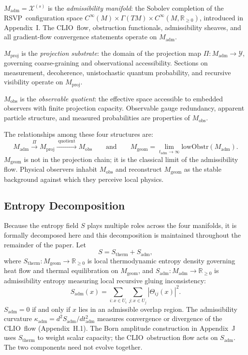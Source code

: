\documentclass[12pt,a4paper]{article}
\newcommand{\RSVP}{\textrm{RSVP}}
\newcommand{\CLIO}{\textrm{CLIO}}
\newcommand{\Field}{\mathcal{X}}
\begin{document}
$M_\mathrm{adm} = \Field^{(s)}$ is the \emph{admissibility manifold}: the
Sobolev completion of the \RSVP\ configuration space
$C^\infty(M)\times\Gamma(TM)\times C^\infty(M,\mathbb{R}_{\geq 0})$, introduced
in Appendix~I. The \CLIO\ flow, obstruction functionals, admissibility sheaves,
and all gradient-flow convergence statements operate on $M_\mathrm{adm}$.

$M_\mathrm{proj}$ is the \emph{projection substrate}: the domain of the
projection map $\Pi:M_\mathrm{adm}\to\mathcal{Y}$, governing coarse-graining
and observational accessibility. Sections on measurement, decoherence,
unistochastic quantum probability, and recursive visibility operate on
$M_\mathrm{proj}$.

$M_\mathrm{obs}$ is the \emph{observable quotient}: the effective space
accessible to embedded observers with finite projection capacity. Observable
gauge redundancy, apparent particle structure, and measured probabilities are
properties of $M_\mathrm{obs}$.

The relationships among these four structures are:
\[
M_\mathrm{adm}
\xrightarrow{\;\Pi\;}
M_\mathrm{proj}
\xrightarrow{\;\mathrm{quotient}\;}
M_\mathrm{obs}
\qquad\text{and}\qquad
M_\mathrm{geom}
= \lim_{t_\mathrm{adm}\to\infty}
  \mathrm{lowObstr}(M_\mathrm{adm}).
\]
$M_\mathrm{geom}$ is not in the projection chain; it is the classical limit of
the admissibility flow. Physical observers inhabit $M_\mathrm{obs}$ and
reconstruct $M_\mathrm{geom}$ as the stable background against which they
perceive local physics.

\subsection{Entropy Decomposition}

Because the entropy field $S$ plays multiple roles across the four manifolds,
it is formally decomposed here and this decomposition is maintained throughout
the remainder of the paper. Let
\[
S = S_\mathrm{therm} + S_\mathrm{adm},
\]
where $S_\mathrm{therm}: M_\mathrm{geom}\to\mathbb{R}_{\geq 0}$ is local
thermodynamic entropy density governing heat flow and thermal equilibration on
$M_\mathrm{geom}$, and $S_\mathrm{adm}: M_\mathrm{adm}\to\mathbb{R}_{\geq 0}$
is admissibility entropy measuring local recursive gluing inconsistency:
\[
S_\mathrm{adm}(x) = \sum_{i:x\in U_i}\sum_{j:x\in U_j}|\Theta_{ij}(x)|^2.
\]
$S_\mathrm{adm}=0$ if and only if $x$ lies in an admissible overlap region.
The admissibility curvature $\kappa_\mathrm{adm}=d^2S_\mathrm{adm}/dt_\mathrm{adm}^2$
measures convergence or divergence of the \CLIO\ flow (Appendix~H.1). The
Born amplitude construction in Appendix~J uses $S_\mathrm{therm}$ to weight
scalar capacity; the \CLIO\ obstruction flow acts on $S_\mathrm{adm}$. The two
components need not evolve together.
\end{document}
